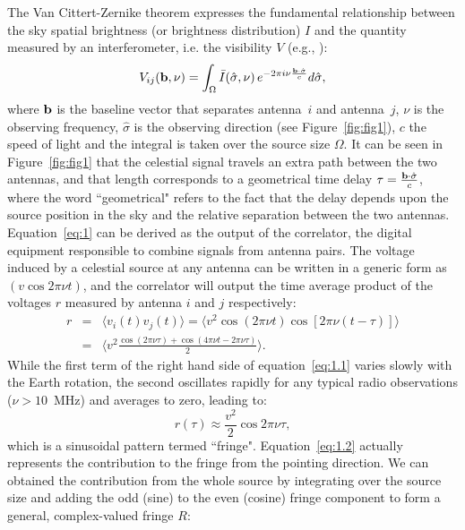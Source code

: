 The Van Cittert-Zernike theorem expresses the fundamental relationship between the sky spatial brightness (or brightness distribution) $I$ and the quantity measured by an interferometer, i.e. the visibility $V$ (e.g., \cite{TMS}):
\begin{equation}
V_{ij} ({\bf b}, \nu) = \int_\Omega {\bar I} (\hat{\bf \sigma}, \nu) \, e^{-2 \pi i \nu \frac{{\bf b} \cdot {\hat {\bf \sigma}}}{c}} d \hat{\bf \sigma},
\label{eq:1}
\end{equation}
where ${\bf b}$ is the baseline vector that separates antenna~$i$ and antenna~$j$, $\nu$ is the observing frequency, $\hat{\sigma}$ is the observing direction (see Figure~\ref{fig:fig1}), $c$ the speed of light and the integral is taken over the source size $\Omega$. 
It can be seen in Figure~\ref{fig:fig1} that the celestial signal travels an extra path between the two antennas, and that length corresponds to a geometrical time delay $\tau = \frac{{\bf b} \cdot {\hat {\bf \sigma}}}{c}$, where the word ``geometrical" refers to the fact that the delay depends upon the source position in the sky and the relative separation between the two antennas. Equation~\ref{eq:1} can be derived as the output of the correlator, the digital equipment responsible to combine signals from antenna pairs. The voltage induced by a celestial source at any antenna can be written in a generic form as $(v \cos{2\pi \nu t})$, and the correlator will output the time average product of the voltages $r$ measured by antenna $i$ and $j$ respectively:
\begin{eqnarray}
r & = & \langle v_i(t)v_j(t) \rangle = \langle v^2 \cos{(2\pi \nu t)} \cos{[2\pi \nu (t - \tau)]} \rangle \nonumber \\
			     & = & \langle v^2 \frac{\cos{(2\pi \nu \tau)} + \cos{(4\pi \nu t - 2\pi \nu \tau)}}{2} \rangle. 	
\label{eq:1.1}
\end{eqnarray}
While the first term of the right hand side of equation~\ref{eq:1.1} varies slowly with the Earth rotation, the second oscillates rapidly for any typical radio observations ($\nu > 10$~MHz) and averages to zero, leading to:  
\begin{equation}
r(\tau) \approx \frac{v^2}{2} \cos{2\pi \nu \tau},
\label{eq:1.2}
\end{equation}
which is a sinusoidal pattern termed ``fringe".
Equation~\ref{eq:1.2} actually represents the contribution to the fringe from the pointing direction. We can obtained the contribution from the whole source by integrating over the source size and adding the odd (sine) to the even (cosine) fringe component to form a general, complex-valued fringe $R$: 
